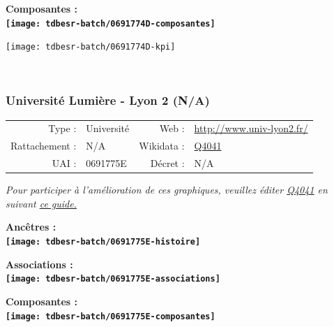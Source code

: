 \documentclass[12pt,french,]{article}
\begin{document}
\begin{center} \bf Composantes : \\  
\texttt{[image: tdbesr-batch/0691774D-composantes]} \end{center}

\begin{center}\texttt{[image: tdbesr-batch/0691774D-kpi]} \end{center}\checkoddpage

\ifoddpage ~\newpage \fi   

\hypertarget{universituxe9-lumiuxe8re---lyon-2-na}{%
\subsubsection{Université Lumière - Lyon 2
(N/A)}\label{universituxe9-lumiuxe8re---lyon-2-na}}

\begin{tabular*}{\textwidth}{rp{5cm}rl}  
\hline  
Type : & Université & Web : &\href{http://www.univ-lyon2.fr/}{http://www.univ-lyon2.fr/} \\  
Rattachement : & N/A & Wikidata : & \href{https://www.wikidata.org/entity/Q4041}{Q4041} \\  
UAI : & 0691775E & Décret : & N/A \\  
\hline  
\end{tabular*}

\textit{\scriptsize Pour participer à l'amélioration de ces graphiques, veuillez éditer  \href{https://www.wikidata.org/entity/Q4041}{Q4041}  en suivant \href{https://github.com/cpesr/wikidataESR/blob/master/Rmd/wikidataESR.md}{ce guide.}}

\vspace{1cm}  
\begin{minipage}[b]{0.50\textwidth}\begin{center} \bf Ancêtres : \\  
\texttt{[image: tdbesr-batch/0691775E-histoire]} \end{center}\end{minipage}\begin{minipage}[b]{0.50\textwidth}\begin{center} \bf Associations : \\  
\texttt{[image: tdbesr-batch/0691775E-associations]} \end{center}\end{minipage}

\hrulefill

\begin{center} \bf Composantes : \\  
\texttt{[image: tdbesr-batch/0691775E-composantes]} \end{center}
\end{document}

